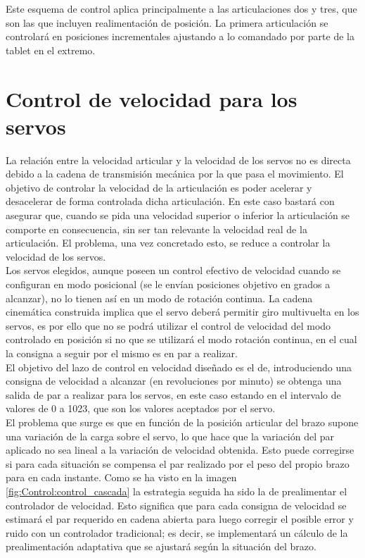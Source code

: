 Este esquema de control aplica principalmente a las articulaciones dos y tres, que son las que incluyen realimentación de posición. La primera articulación se controlará en posiciones incrementales ajustando a lo comandado por parte de la tablet en el extremo.

\section{Control de velocidad para los servos} \label{sec:Control:velocidad_g15}

La relación entre la velocidad articular y la velocidad de los servos no es directa debido a la cadena de transmisión mecánica por la que pasa el movimiento. El objetivo de controlar la velocidad de la articulación es poder acelerar y desacelerar de forma controlada dicha articulación. En este caso bastará con asegurar que, cuando se pida una velocidad superior o inferior la articulación se comporte en consecuencia, sin ser tan relevante la velocidad real de la articulación. El problema, una vez concretado esto, se reduce a controlar la velocidad de los servos.
\\

Los servos elegidos, aunque poseen un control efectivo de velocidad cuando se configuran en modo posicional (se le envían posiciones objetivo en grados a alcanzar), no lo tienen así en un modo de rotación continua. La cadena cinemática construida implica que el servo deberá permitir giro multivuelta en los servos, es por ello que no se podrá utilizar el control de velocidad del modo controlado en posición si no que se utilizará el modo rotación continua, en el cual la consigna a seguir por el mismo es en par a realizar.
\\

El objetivo del lazo de control en velocidad diseñado es el de, introduciendo una consigna de velocidad a alcanzar (en revoluciones por minuto) se obtenga una salida de par a realizar para los servos, en este caso estando en el intervalo de valores de 0 a 1023, que son los valores aceptados por el servo.
\\

El problema que surge es que en función de la posición articular del brazo supone una variación de la carga sobre el servo, lo que hace que la variación del par aplicado no sea lineal a la variación de velocidad obtenida. Esto puede corregirse si para cada situación se compensa el par realizado por el peso del propio brazo para en cada instante.
Como se ha visto en la imagen \ref{fig:Control:control_cascada} la estrategia seguida ha sido la de prealimentar el controlador de velocidad. Esto significa que para cada consigna de velocidad se estimará el par requerido en cadena abierta para luego corregir el posible error y ruido con un controlador tradicional; es decir, se implementará un cálculo de la prealimentación adaptativa que se ajustará según la situación del brazo.
\\

